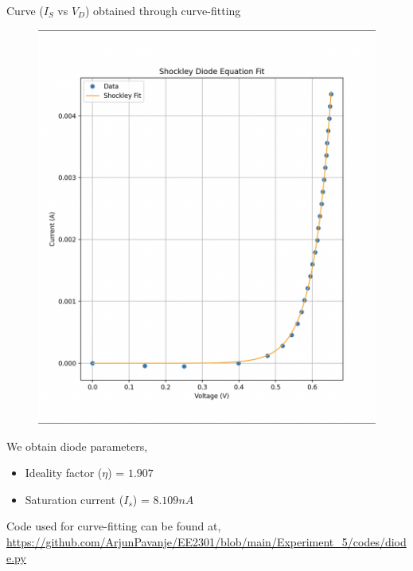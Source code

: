 \documentclass[12pt,a4paper]{article}
\begin{document}
\pagebreak
\newline Curve ($I_S$ vs $V_D$) obtained through curve-fitting
\begin{figure}[h!]
    \centering
    \includegraphics[width=0.7\linewidth]{figs/curve_fit.png}
\end{figure}
\newline We obtain diode parameters,
\begin{itemize}
    \item Ideality factor ($\eta$) = $1.907$
    \item Saturation current ($I_s$) = $8.109nA$
\end{itemize}
Code used for curve-fitting can be found at, \url{https://github.com/ArjunPavanje/EE2301/blob/main/Experiment_5/codes/diode.py}
\pagebreak
\end{document}
